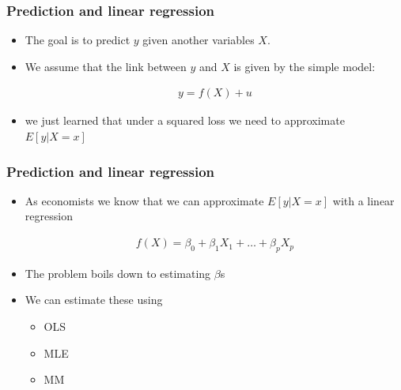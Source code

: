 \documentclass[
  shownotes,
  xcolor={svgnames},
  hyperref={colorlinks,citecolor=DarkBlue,linkcolor=andesred,urlcolor=DarkBlue}
  , aspectratio=169]{beamer}
\begin{document}
\begin{frame}
\frametitle{Prediction and linear regression}




\begin{itemize}
  \item The goal is to predict $y$ given another variables $X$. 
  \medskip
  \item We  assume that the link between $y$ and $X$ is given by the simple model:


\begin{align}
  y = f(X) + u
\end{align}

\item we just learned that under a squared loss we need to approximate $E[y|X=x]$
\end{itemize}

\end{frame}
\begin{frame}
\frametitle{Prediction and linear regression}

\begin{itemize}
\item As economists we know that we can approximate $E[y|X=x]$ with a linear regression

\begin{align}
  f(X) = \beta_0 + \beta_1 X_1 + \dots + \beta_p X_p 
\end{align}

\item The problem boils down to estimating $\beta$s
\medskip
\item We can estimate these using
  \begin{itemize}
    \footnotesize
    \item  OLS
    \medskip
    \item MLE
    \medskip
    \item MM
  \end{itemize}  
\end{itemize}

\end{frame}
\end{document}
